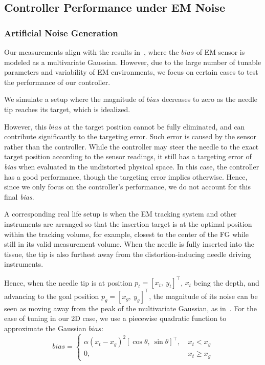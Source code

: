 \subsection{Controller Performance under EM Noise}
\label{sec:chap-5-controller-performance-em-noise}

\subsubsection{Artificial Noise Generation}
\label{sec:chap-5-artificial-noise}

Our measurements align with the results in~\parencite{sadjadiSimultaneousElectromagneticTracking2016}, where the $bias$ of EM sensor is modeled as a multivariate Gaussian. However, due to the large number of tunable parameters and variability of EM environments, we focus on certain cases to test the performance of our controller.

We simulate a setup where the magnitude of $bias$ decreases to zero as the needle tip reaches its target, which is idealized.

However, this $bias$ at the target position cannot be fully eliminated, and can contribute significantly to the targeting error. Such error is caused by the sensor rather than the controller. While the controller may steer the needle to the exact target position according to the sensor readings, it still has a targeting error of \textit{bias} when evaluated in the undistorted physical space. In this case, the controller has a good performance, though the targeting error implies otherwise. Hence, since we only focus on the controller's performance, we do not account for this final \textit{bias}.

A corresponding real life setup is when the EM tracking system and other instruments are arranged so that the insertion target is at the optimal position within the tracking volume, for example, closest to the center of the FG while still in its valid measurement volume. When the needle is fully inserted into the tissue, the tip is also furthest away from the distortion-inducing needle driving instruments.

Hence, when the needle tip is at position $p_t = [x_t, \ y_t]^\top$, $x_t$ being the depth, and advancing to the goal position $p_{g} = [x_{g}, \ y_{g}]^\top$, the magnitude of its noise can be seen as moving away from the peak of the multivariate Gaussian, as in~\parencite{sadjadiSimultaneousElectromagneticTracking2016}. For the ease of tuning in our 2D case, we use a piecewise quadratic function to approximate the Gaussian $bias$:
\begin{equation}
  \label{eq:chap-5-noise-bias}
  bias = \begin{cases}
    \alpha(x_t - x_g)^2 [\cos\theta, \ \sin\theta]^\top, \ & x_t < x_{g} \\
    0, \ & x_t \geq x_{g}
  \end{cases}
\end{equation}

